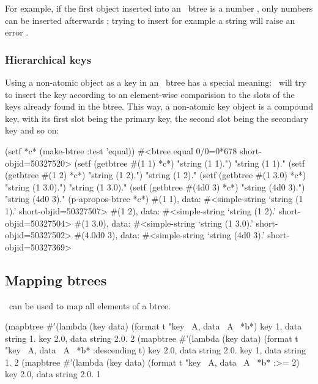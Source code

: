 For example, if the first object inserted into an \ btree
is a number \oi, only numbers can be inserted afterwards \oii; trying
to insert for example a string will raise an error \oiii.

\subsubsection{Hierarchical keys}%
\label{sec:HierarchicalKeys}

Using a non-atomic object as a key in an \ btree has a
special meaning: \plob\ will try to insert the key according to an
element-wise comparision to the slots of the keys already found in the
btree. This way, a non-atomic key object is a compound key, with its
first slot being the primary key, the second slot being the secondary
key and so on:
\begin{IndentedCompactCode}
\listener{}(setf *c* (make-btree :test 'equal))
#<btree equal 0/0=0*678 short-objid=50327520>
\listener{}(setf (getbtree #(1 1) *c*) "string (1 1).")
"string (1 1)."
\listener{}(setf (getbtree #(1 2) *c*) "string (1 2).")
"string (1 2)."
\listener{}(setf (getbtree #(1 3.0) *c*) "string (1 3.0).")
"string (1 3.0)."
\listener{}(setf (getbtree #(4d0 3) *c*) "string (4d0 3).")
"string (4d0 3)."
\listener{}(p-apropos-btree *c*)
#(1 1), data: #<simple-string `string (1 1).' short-objid=50327507>
#(1 2), data: #<simple-string `string (1 2).' short-objid=50327504>
#(1 3.0), data: #<simple-string `string (1 3.0).' short-objid=50327502>
#(4.0d0 3), data: #<simple-string `string (4d0 3).' short-objid=50327369>
\end{IndentedCompactCode}

\subsection{Mapping btrees}

\ can be used to map all elements of a btree.
\begin{IndentedCompactCode}
\listener{}(mapbtree #'(lambda (key data)\marginnumber{\smalloi}
                          (format t "key ~A, data ~A~%
                       *b*)
key 1, data string 1.
key 2.0, data string 2.0.
2\marginnumber{\smalloiii}
\listener{}(mapbtree #'(lambda (key data)
                          (format t "key ~A, data ~A~%
                       *b* :descending t)\marginnumber{\smalloiv}
key 2.0, data string 2.0.
key 1, data string 1.
2\marginnumber{\smalloiii}
\listener{}(mapbtree #'(lambda (key data)\marginnumber{\smallov}
                          (format t "key ~A, data ~A~%
                       *b* :>= 2)
key 2.0, data string 2.0.
1\marginnumber{\smalloiii}
\end{IndentedCompactCode}

